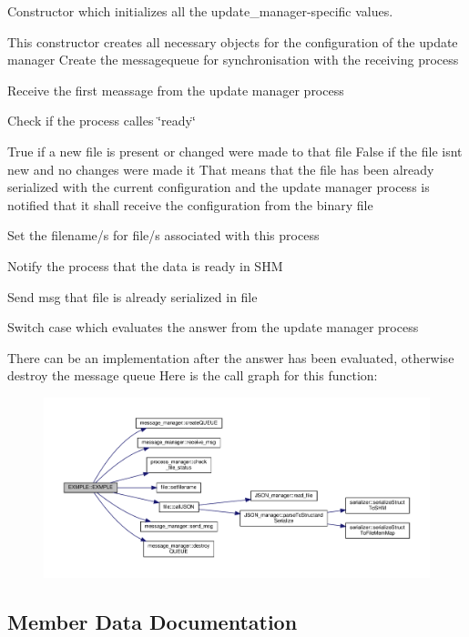 Constructor which initializes all the update\+\_\+manager-\/specific values. 

This constructor creates all necessary objects for the configuration of the update manager Create the messagequeue for synchronisation with the receiving process

Receive the first meassage from the update manager process

Check if the process calles \char`\"{}ready\char`\"{}

True if a new file is present or changed were made to that file False if the file isnt new and no changes were made it That means that the file has been already serialized with the current configuration and the update manager process is notified that it shall receive the configuration from the binary file

Set the filename/s for file/s associated with this process

Notify the process that the data is ready in S\+HM

Send msg that file is already serialized in file

Switch case which evaluates the answer from the update manager process

There can be an implementation after the answer has been evaluated, otherwise destroy the message queue Here is the call graph for this function\+:
\nopagebreak
\begin{figure}[H]
\begin{center}
\leavevmode
\includegraphics[width=350pt]{classEXMPLE_a5969fa4c73afad1ed1a1d82b88117f80_cgraph}
\end{center}
\end{figure}


\subsection{Member Data Documentation}
\mbox{\label{classEXMPLE_a2d5be0ecf649d40719d2c94cd683fe3f}} 
